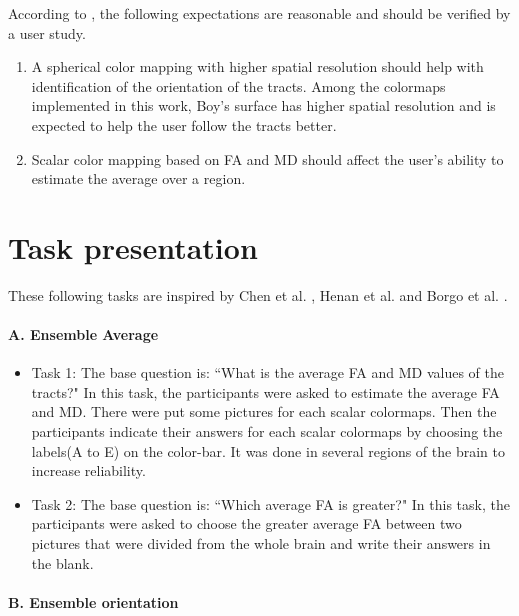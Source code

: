 \documentclass[a4paper, 12pt]{report}
\begin{document}
According to \cite{chen}, the following expectations are reasonable and should be verified by a user study.
\begin{enumerate}
	\item A spherical color mapping with higher spatial resolution should help with identification of the orientation of the tracts. Among the colormaps implemented in this work, Boy's surface has higher spatial resolution and is expected to help the user follow the tracts better.
	\item Scalar color mapping based on FA and MD should affect the user's ability to estimate the average over a region.
\end{enumerate}

\section{Task presentation}
These following tasks are inspired by Chen et al. \cite{chen}, Henan et al. \cite{henan} and Borgo et al. \cite{borgo}.

\paragraph{A. Ensemble Average}

\begin{itemize}
	\item{Task 1:} The base question is: ``What is the average FA and MD values of the tracts?"
	In this task, the participants were asked to estimate the average FA and MD. There were put some pictures for each scalar colormaps. Then the participants indicate their answers for each scalar colormaps by choosing the labels(A to E) on the color-bar. It was done in several regions of the brain to increase reliability. 
	
	
	\item{Task 2:} The base question is: ``Which average FA is greater?"
	In this task, the participants were asked to choose the greater average FA between two pictures that were divided from the whole brain and write their answers in the blank. 
	
\end{itemize}


\paragraph{B. Ensemble orientation}
\end{document}
